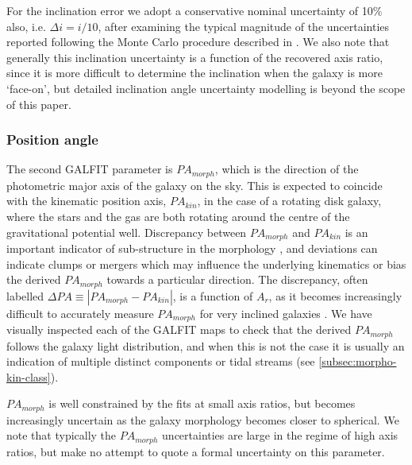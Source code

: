 \documentclass[fleqn,usenatbib]{mn2e}
\begin{document}
For the inclination error we adopt a conservative nominal uncertainty of 10$\%$ also, i.e. $\Delta i = i / 10$, after examining the typical magnitude of the uncertainties reported following the Monte Carlo procedure described in \cite{Epinat2012}.
We also note that generally this inclination uncertainty is a function of the recovered axis ratio, since it is more difficult to determine the inclination when the galaxy is more `face-on', but detailed inclination angle uncertainty modelling is beyond the scope of this paper.

\subsubsection{Position angle}\label{subsubsection:position_angle}
The second GALFIT parameter is $PA_{morph}$, which is the direction of the photometric major axis of the galaxy on the sky.
This is expected to coincide with the kinematic position axis, $PA_{kin}$, in the case of a rotating disk galaxy, where the stars and the gas are both rotating around the centre of the gravitational potential well.
Discrepancy between $PA_{morph}$ and $PA_{kin}$ is an important indicator of sub-structure in the morphology \citep[e.g.][]{Queyrel2012,Wisnioski2015,Rodrigues2016}, and deviations can indicate clumps or mergers which may influence the underlying kinematics or bias the derived $PA_{morph}$ towards a particular direction. 
The discrepancy, often labelled $\Delta PA \equiv |PA_{morph} - PA_{kin}|$, is a function of $A_{r}$, as it becomes increasingly difficult to accurately measure $PA_{morph}$ for very inclined galaxies \citep[e.g.][]{Wisnioski2015,Harrison2017}.
We have visually inspected each of the GALFIT maps to check that the derived $PA_{morph}$ follows the galaxy light distribution, and when this is not the case it is usually an indication of multiple distinct components or tidal streams (see \cref{subsec:morpho-kin-class}).

$PA_{morph}$ is well constrained by the fits at small axis ratios, but becomes increasingly uncertain as the galaxy morphology becomes closer to spherical.
We note that typically the $PA_{morph}$ uncertainties are large in the regime of high axis ratios, but make no attempt to quote a formal uncertainty on this parameter.
\end{document}
